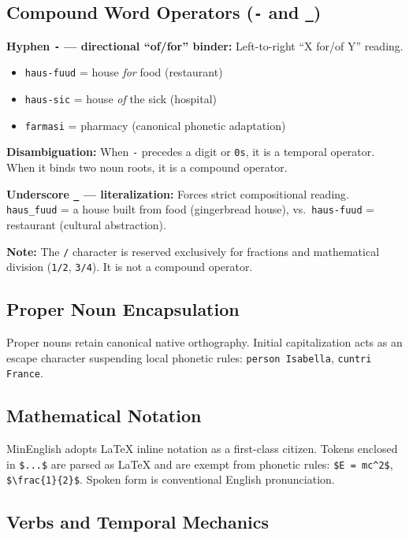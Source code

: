\documentclass[10pt,onecolumn,letterpaper]{article}
\newcommand{\me}[1]{\texttt{#1}}
\begin{document}
\subsection{Compound Word Operators (\me{-} and \me{\_})}

\textbf{Hyphen \me{-} --- directional ``of/for'' binder:}
Left-to-right ``X for/of Y'' reading.
\begin{itemize}[leftmargin=*,noitemsep]
    \item \me{haus-fuud} = house \textit{for} food (restaurant)
    \item \me{haus-sic} = house \textit{of} the sick (hospital)
    \item \me{farmasi} = pharmacy (canonical phonetic adaptation)
\end{itemize}

\textbf{Disambiguation:} When \me{-} precedes a digit or \me{0s}, it is a
temporal operator. When it binds two noun roots, it is a compound operator.

\textbf{Underscore \me{\_} --- literalization:} Forces strict compositional
reading. \me{haus\_fuud} = a house built from food (gingerbread house),
vs.\ \me{haus-fuud} = restaurant (cultural abstraction).

\textbf{Note:} The \me{/} character is reserved exclusively for fractions
and mathematical division (\me{1/2}, \me{3/4}). It is not a compound operator.

\subsection{Proper Noun Encapsulation}
Proper nouns retain canonical native orthography. Initial capitalization acts
as an escape character suspending local phonetic rules: \me{person Isabella},
\me{cuntri France}.

\subsection{Mathematical Notation}
MinEnglish adopts LaTeX inline notation as a first-class citizen. Tokens
enclosed in \texttt{\$...\$} are parsed as LaTeX and are exempt from phonetic
rules: \texttt{\$E = mc\^{}2\$}, \texttt{\$\textbackslash frac\{1\}\{2\}\$}.
Spoken form is conventional English pronunciation.

\subsection{Verbs and Temporal Mechanics}
\end{document}
